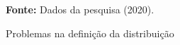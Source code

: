\begin{figure}[ht!]
\centering

\caption{\textmd{Problemas na definição da distribuição}}
\label{fig:figerroniveis}

\par\medskip\textbf{Fonte:} Dados da pesquisa (2020). \par\medskip

\end{figure}


